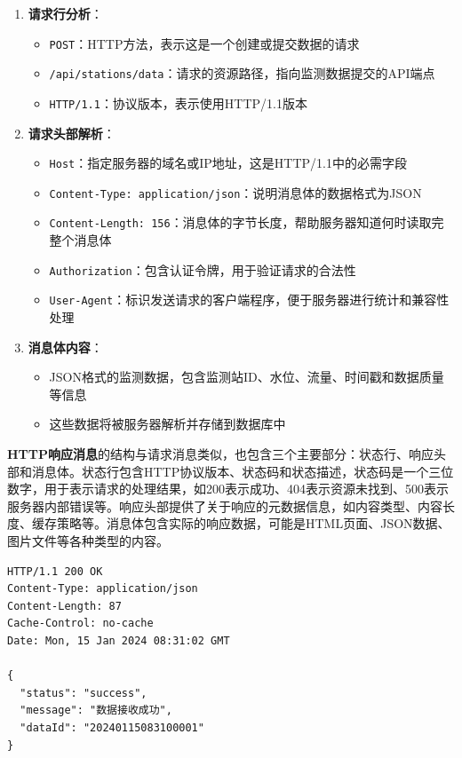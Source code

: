 \begin{enumerate}
\def\labelenumi{\arabic{enumi}.}
\tightlist
\item
  \textbf{请求行分析}：

  \begin{itemize}
  \tightlist
  \item
    \texttt{POST}：HTTP方法，表示这是一个创建或提交数据的请求
  \item
    \texttt{/api/stations/data}：请求的资源路径，指向监测数据提交的API端点
  \item
    \texttt{HTTP/1.1}：协议版本，表示使用HTTP/1.1版本
  \end{itemize}
\item
  \textbf{请求头部解析}：

  \begin{itemize}
  \tightlist
  \item
    \texttt{Host}：指定服务器的域名或IP地址，这是HTTP/1.1中的必需字段
  \item
    \texttt{Content-Type: application/json}：说明消息体的数据格式为JSON
  \item
    \texttt{Content-Length: 156}：消息体的字节长度，帮助服务器知道何时读取完整个消息体
  \item
    \texttt{Authorization}：包含认证令牌，用于验证请求的合法性
  \item
    \texttt{User-Agent}：标识发送请求的客户端程序，便于服务器进行统计和兼容性处理
  \end{itemize}
\item
  \textbf{消息体内容}：

  \begin{itemize}
  \tightlist
  \item
    JSON格式的监测数据，包含监测站ID、水位、流量、时间戳和数据质量等信息
  \item
    这些数据将被服务器解析并存储到数据库中
  \end{itemize}
\end{enumerate}

\textbf{HTTP响应消息}的结构与请求消息类似，也包含三个主要部分：状态行、响应头部和消息体。状态行包含HTTP协议版本、状态码和状态描述，状态码是一个三位数字，用于表示请求的处理结果，如200表示成功、404表示资源未找到、500表示服务器内部错误等。响应头部提供了关于响应的元数据信息，如内容类型、内容长度、缓存策略等。消息体包含实际的响应数据，可能是HTML页面、JSON数据、图片文件等各种类型的内容。

\begin{lstlisting}[language=Http]
HTTP/1.1 200 OK
Content-Type: application/json
Content-Length: 87
Cache-Control: no-cache
Date: Mon, 15 Jan 2024 08:31:02 GMT

{
  "status": "success",
  "message": "数据接收成功",
  "dataId": "20240115083100001"
}
\end{lstlisting}

